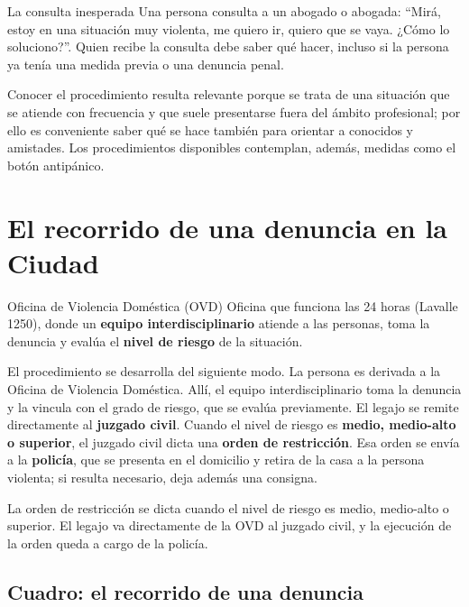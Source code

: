 \documentclass[12pt,oneside]{book}
\begin{document}
\begin{example}{La consulta inesperada}
Una persona consulta a un abogado o abogada: ``Mirá, estoy en una situación muy violenta, me quiero ir, quiero que se vaya. ¿Cómo lo soluciono?''. Quien recibe la consulta debe saber qué hacer, incluso si la persona ya tenía una medida previa o una denuncia penal.
\end{example}

Conocer el procedimiento resulta relevante porque se trata de una situación que se atiende con frecuencia y que suele presentarse fuera del ámbito profesional; por ello es conveniente saber qué se hace también para orientar a conocidos y amistades. Los procedimientos disponibles contemplan, además, medidas como el botón antipánico.

\section{El recorrido de una denuncia en la Ciudad}

\begin{definition}{Oficina de Violencia Doméstica (OVD)}
Oficina que funciona las 24 horas (Lavalle 1250), donde un \textbf{equipo interdisciplinario} atiende a las personas, toma la denuncia y evalúa el \textbf{nivel de riesgo} de la situación.
\end{definition}

El procedimiento se desarrolla del siguiente modo. La persona es derivada a la Oficina de Violencia Doméstica. Allí, el equipo interdisciplinario toma la denuncia y la vincula con el grado de riesgo, que se evalúa previamente. El legajo se remite directamente al \textbf{juzgado civil}. Cuando el nivel de riesgo es \textbf{medio, medio-alto o superior}, el juzgado civil dicta una \textbf{orden de restricción}. Esa orden se envía a la \textbf{policía}, que se presenta en el domicilio y retira de la casa a la persona violenta; si resulta necesario, deja además una consigna.

\begin{important}
La orden de restricción se dicta cuando el nivel de riesgo es medio, medio-alto o superior. El legajo va directamente de la OVD al juzgado civil, y la ejecución de la orden queda a cargo de la policía.
\end{important}

\subsection{Cuadro: el recorrido de una denuncia}
\end{document}
